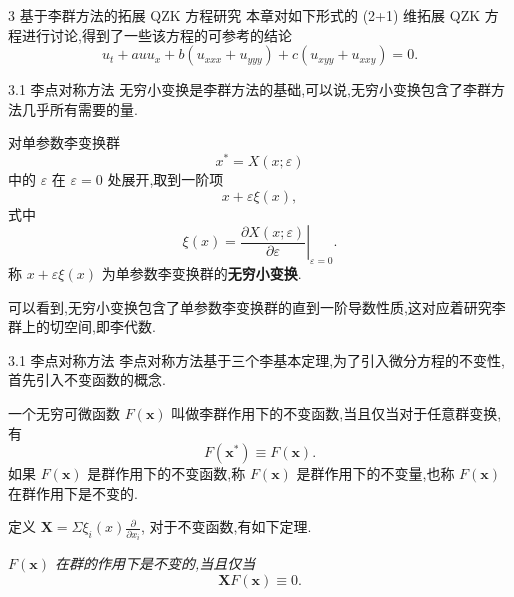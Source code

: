 \documentclass{beamer}
\begin{document}
\begin{frame}{3 基于李群方法的拓展 QZK 方程研究}
\qquad 本章对如下形式的 (2+1) 维拓展 QZK 方程进行讨论,得到了一些该方程的可参考的结论
\begin{equation*}
u_{t}+auu_{x}+b(u_{xxx}+u_{yyy})+c(u_{xyy}+u_{xxy})=0.
\end{equation*}
\end{frame}

\begin{frame}{3.1 李点对称方法}
\qquad 无穷小变换是李群方法的基础,可以说,无穷小变换包含了李群方法几乎所有需要的量.

\qquad 对单参数李变换群
\begin{equation}\label{eq:liet}
x^{*}=X(x;\varepsilon)
\end{equation}
中的 $\varepsilon$ 在 $\varepsilon=0$ 处展开,取到一阶项
\begin{equation*}
x+\varepsilon \xi(x),
\end{equation*}
式中
\begin{equation*}
\xi(x)=\left.\frac{\partial X(x;\varepsilon)}{\partial \varepsilon}\right|_{\varepsilon=0}.
\end{equation*}
称 $x+\varepsilon \xi(x)$ 为单参数李变换群的\textbf{无穷小变换}.

\qquad 可以看到,无穷小变换包含了单参数李变换群的直到一阶导数性质,这对应着研究李群上的切空间,即李代数.
\end{frame}

\begin{frame}{3.1 李点对称方法}
\qquad 李点对称方法基于三个李基本定理,为了引入微分方程的不变性,首先引入不变函数的概念.
\begin{definition}[不变函数]
	一个无穷可微函数 $F(\mathbf{x})$ 叫做李群作用下的不变函数,当且仅当对于任意群变换,有
	\begin{equation*}
		F(\mathbf{x^*})\equiv F(\mathbf{x}).
	\end{equation*}
如果 $F(\mathbf{x})$ 是群作用下的不变函数,称 $F(\mathbf{x})$ 是群作用下的不变量,也称 $F(\mathbf{x})$ 在群作用下是不变的.
\end{definition}

定义 $\boldsymbol {X}=\Sigma \xi_i(x)\frac{\partial}{\partial x_i}$, 对于不变函数,有如下定理.
\begin{theorem}
\emph{	$F(\mathbf{x})$ 在群的作用下是不变的,当且仅当
	\begin{equation*}
		\boldsymbol {X}F(\mathbf{x})\equiv 0.
	\end{equation*}}%
\end{theorem}
\end{frame}
\end{document}
